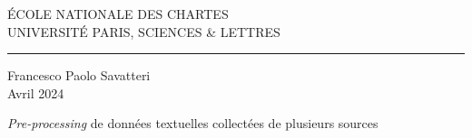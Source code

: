 
		\begin{center}
			
			\bigskip
			
			\begin{large}				
				ÉCOLE NATIONALE DES CHARTES\\
				UNIVERSITÉ PARIS, SCIENCES \& LETTRES
			\end{large}
			\begin{center}\rule{2cm}{0.02cm}\end{center}
			
			\bigskip
			\bigskip
			\bigskip
			\begin{large}
				Francesco Paolo Savatteri\\
				\vspace{1.3\baselineskip}
				Avril 2024
			\end{large}
			
			\vspace{8\baselineskip}
			
			\begin{Large}
				\emph{Pre-processing} de données textuelles collectées de plusieurs sources
			\end{Large}
	
	
	
			\vfill
			
			
		\end{center}

	
	\thispagestyle{empty}	
	\cleardoublepage